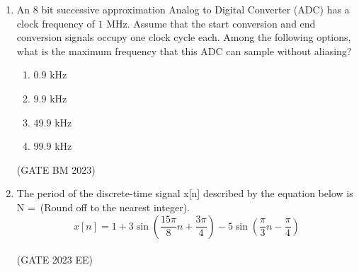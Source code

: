 \begin{enumerate}[label=\thechapter.\arabic*,ref=\thechapter.\theenumi]
\solution
\newpage


\item An $8$ bit successive approximation Analog to Digital Converter (ADC) has a clock
frequency of $1$ MHz. Assume that the start conversion and end conversion signals
occupy one clock cycle each. Among the following options, what is the maximum
frequency that this ADC can sample without aliasing?
\begin{enumerate}[label=\alph*)]
    \item $0.9$ kHz
    \item $9.9$ kHz
    \item $49.9$ kHz
    \item $99.9$ kHz
\end{enumerate}
\hfill(GATE BM 2023)

\solution
\newpage

\item The period of the discrete-time signal x[n] described by the equation below is N =\ (Round off to the nearest integer).
$$x[n] = 1 + 3\sin\left(\frac{15\pi}{8}n + \frac{3\pi}{4}\right) - 5\sin\left(\frac{\pi}{3}n - \frac{\pi}{4}\right)$$\\
\hfill (GATE 2023 EE)
\solution
\newpage

\end{enumerate}
